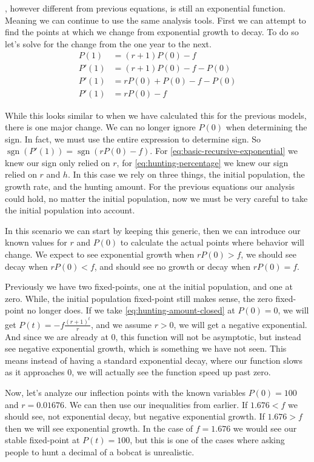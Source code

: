 \documentclass{article}
\DeclareMathOperator{\sgn}{sgn}
\begin{document}
, however different from previous equations, is still an exponential function. Meaning we can continue to use the same analysis tools. First we can attempt to find the points at which we change from exponential growth to decay. To do so let's solve for the change from the one year to the next.
\begin{align*}
    P(1) &= (r + 1)P(0)-f \\
    P'(1) &= (r + 1)P(0) - f - P(0) \\
    P'(1) &= rP(0)+P(0)-f-P(0) \\
    P'(1) &= rP(0) - f
\end{align*}

While this looks similar to when we have calculated this for the previous models, there is one major change. We can no longer ignore $P(0)$ when determining the sign. In fact, we must use the entire expression to determine sign. So $\sgn(P'(1)) = \sgn(rP(0)-f)$. For \cref{eq:basic-recursive-exponential} we knew our sign only relied on $r$, for \cref{eq:hunting-percentage} we knew our sign relied on $r$ and $h$. In this case we rely on three things, the initial population, the growth rate, and the hunting amount. For the previous equations our analysis could hold, no matter the initial population, now we must be very careful to take the initial population into account.

In this scenario we can start by keeping this generic, then we can introduce our known values for $r$ and $P(0)$ to calculate the actual points where behavior will change. We expect to see exponential growth when $rP(0)>f$, we should see decay when $rP(0)<f$, and should see no growth or decay when $rP(0)=f$.

Previously we have two fixed-points, one at the initial population, and one at zero. While, the initial population fixed-point still makes sense, the zero fixed-point no longer does. If we take \cref{eq:hunting-amount-closed} at $P(0)=0$, we will get $P(t) = -f\frac{(r+1)^t}{r}$, and we assume $r > 0$, we will get a negative exponential. And since we are already at 0, this function will not be asymptotic, but instead see negative exponential growth, which is something we have not seen. This means instead of having a standard exponential decay, where our function slows as it approaches 0, we will actually see the function speed up past zero.

Now, let's analyze our inflection points with the known variables $P(0) = 100$ and $r = 0.01676$. We can then use our inequalities from earlier. If $1.676<f$ we should see, not exponential decay, but negative exponential growth. If $1.676>f$ then we will see exponential growth. In the case of $f=1.676$ we would see our stable fixed-point at $P(t)=100$, but this is one of the cases where asking people to hunt a decimal of a bobcat is unrealistic.
\end{document}
